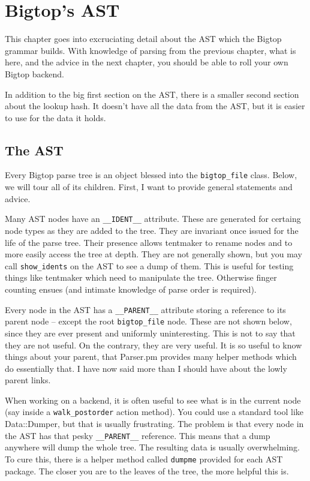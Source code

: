 \chapter{Bigtop's AST}
\label{chap:bigtopast}

This chapter goes into excruciating detail about the AST which the
Bigtop grammar builds.  With knowledge of parsing from the previous
chapter, what is here, and the advice in the next chapter, you should
be able to roll your own Bigtop backend.

In addition to the big first section on the AST, there is a smaller
second section about the lookup hash.  It doesn't have all the data
from the AST, but it is easier to use for the data it holds.

\section{The AST}

Every Bigtop parse tree is an object blessed into the \verb+bigtop_file+ class.
Below, we will tour all of its children.  First, I want to provide
general statements and advice.

Many AST nodes have an \verb+__IDENT__+ attribute.  These are generated
for certaing node types as they are added to the tree.  They are invariant
once issued for the life of the parse tree.  Their presence allows tentmaker
to rename nodes and to more easily access the tree at depth.  They are not
generally shown, but you may call \verb+show_idents+ on the AST to see a
dump of them.  This is useful for testing things like tentmaker which need
to manipulate the tree.  Otherwise finger counting ensues (and intimate
knowledge of parse order is required).

Every node in the AST has a \verb+__PARENT__+ attribute storing a reference
to its parent node -- except the root \verb+bigtop_file+ node.  These are
not shown below, since they are ever present and uniformly uninteresting.
This is not to say that they are not useful.  On the contrary, they are very
useful.  It is so useful to know things about your parent, that Parser.pm
provides many helper methods which do essentially that.  I have now said more
than I should have about the lowly parent links.

When working on a backend, it is often useful to see what is in the
current node (say inside a \verb+walk_postorder+ action method).  You
could use a standard tool like Data::Dumper, but that is usually frustrating.
The problem is that every node in the AST has that pesky \verb+__PARENT__+
reference.  This means that a dump anywhere will dump the whole tree.  The
resulting data is usually overwhelming.  To cure this, there is a helper
method called \verb+dumpme+ provided for each AST package.  The closer you
are to the leaves of the tree, the more helpful this is.


